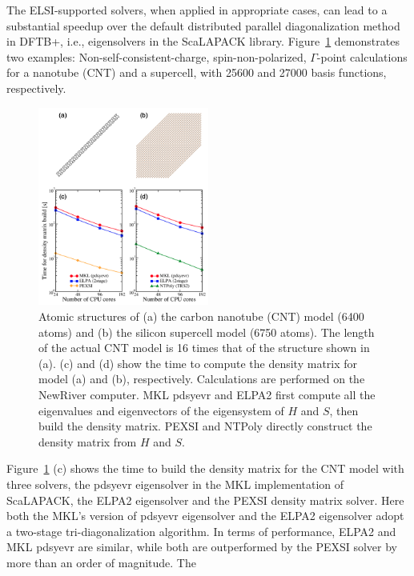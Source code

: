 \documentclass{revtex4-1}
\newcommand{\dftbp}{DFTB+}
\begin{document}
The ELSI-supported solvers, when applied in appropriate cases, can lead to a substantial
speedup over the default distributed parallel diagonalization method in \dftbp{}, i.e.,
eigensolvers in the ScaLAPACK
library.\cite{scalapack_blackford_1997,dc_tisseur_1999,mrrr_vomel_2010}
Figure~\ref{fig:solvers} demonstrates two examples: Non-self-consistent-charge,
spin-non-polarized, $\Gamma$-point calculations for a  nanotube (CNT)
and a  supercell, with 25600 and 27000 basis functions, respectively.
\begin{figure}[htbp]
  \centering
  \includegraphics[width=0.5\textwidth]{figures/solvers.png}
  \caption{Atomic structures of (a) the carbon nanotube (CNT) model (6400
    atoms) and (b) the silicon supercell model (6750 atoms). The length of the
    actual CNT model is 16 times that of the structure shown in (a). (c) and (d)
    show the time to compute the density matrix for model (a) and (b),
    respectively. Calculations are performed on the NewRiver computer. MKL
    pdsyevr and ELPA2 first compute all the eigenvalues and eigenvectors of the
    eigensystem of $H$ and $S$, then build the density matrix. PEXSI and NTPoly
    directly construct the density matrix from $H$ and $S$.}
  \label{fig:solvers}
\end{figure}
Figure~\ref{fig:solvers} (c) shows the time to build the density matrix for the
CNT model with three solvers, the pdsyevr eigensolver in the MKL implementation
of ScaLAPACK, the ELPA2 eigensolver and the PEXSI density matrix solver. Here
both the MKL's version of pdsyevr eigensolver and the ELPA2 eigensolver adopt a
two-stage tri-diagonalization
algorithm.\cite{2stage_bischof_1994,elpa_marek_2014,mkl_arturov_2018} In terms
of performance, ELPA2 and MKL pdsyevr are similar, while both are outperformed
by the PEXSI solver by more than an order of magnitude. The
\end{document}

